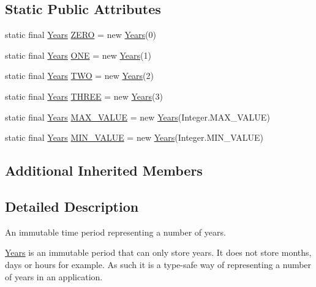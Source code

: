 \subsection*{Static Public Attributes}
\begin{DoxyCompactItemize}
\item 
static final \hyperlink{classorg_1_1joda_1_1time_1_1_years}{Years} \hyperlink{classorg_1_1joda_1_1time_1_1_years_a3ca3e82fc0587ef2e37762844727a140}{Z\-E\-R\-O} = new \hyperlink{classorg_1_1joda_1_1time_1_1_years}{Years}(0)
\item 
static final \hyperlink{classorg_1_1joda_1_1time_1_1_years}{Years} \hyperlink{classorg_1_1joda_1_1time_1_1_years_aae84b40a788d4eda172c64e6444183d5}{O\-N\-E} = new \hyperlink{classorg_1_1joda_1_1time_1_1_years}{Years}(1)
\item 
static final \hyperlink{classorg_1_1joda_1_1time_1_1_years}{Years} \hyperlink{classorg_1_1joda_1_1time_1_1_years_acd8b511971f16e1345d7c00e40a430c6}{T\-W\-O} = new \hyperlink{classorg_1_1joda_1_1time_1_1_years}{Years}(2)
\item 
static final \hyperlink{classorg_1_1joda_1_1time_1_1_years}{Years} \hyperlink{classorg_1_1joda_1_1time_1_1_years_a01da574c01c789fc4b7871a806caf1aa}{T\-H\-R\-E\-E} = new \hyperlink{classorg_1_1joda_1_1time_1_1_years}{Years}(3)
\item 
static final \hyperlink{classorg_1_1joda_1_1time_1_1_years}{Years} \hyperlink{classorg_1_1joda_1_1time_1_1_years_a88ee97f1c5b2a4a3a820790d5aaa36c7}{M\-A\-X\-\_\-\-V\-A\-L\-U\-E} = new \hyperlink{classorg_1_1joda_1_1time_1_1_years}{Years}(Integer.\-M\-A\-X\-\_\-\-V\-A\-L\-U\-E)
\item 
static final \hyperlink{classorg_1_1joda_1_1time_1_1_years}{Years} \hyperlink{classorg_1_1joda_1_1time_1_1_years_a2f47aa3279ff248e2b500ae7ce1b749c}{M\-I\-N\-\_\-\-V\-A\-L\-U\-E} = new \hyperlink{classorg_1_1joda_1_1time_1_1_years}{Years}(Integer.\-M\-I\-N\-\_\-\-V\-A\-L\-U\-E)
\end{DoxyCompactItemize}
\subsection*{Additional Inherited Members}


\subsection{Detailed Description}
An immutable time period representing a number of years. 

{\ttfamily \hyperlink{classorg_1_1joda_1_1time_1_1_years}{Years}} is an immutable period that can only store years. It does not store months, days or hours for example. As such it is a type-\/safe way of representing a number of years in an application. 

